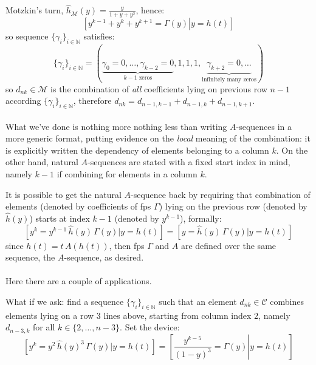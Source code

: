 Motzkin's turn, 
$\hat{h}_{\mathcal{M}}(y) = \frac{y}{1+y+y^2}$, hence:
\begin{displaymath}
        \left.\left[y^{k-1}+y^{k}+y^{k+1}=\Gamma(y)\right| y = h(t) \right]
\end{displaymath}
so sequence $\lbrace \gamma_{i} \rbrace_{i\in\mathbb{N}}$ satisfies:
\begin{displaymath}
    \lbrace \gamma_{i} \rbrace_{i\in\mathbb{N}} = 
        \left(\underbrace{\gamma_{0}=0,\ldots,\gamma_{k-2}=0}_{k-1 \text{ zeros}},
            1,1,1,
            \underbrace{\gamma_{k+2}=0, \ldots}_{\text{infinitely many zeros}} \right)
\end{displaymath}
so $d_{nk}\in\mathcal{M}$ is the combination of \emph{all} coefficients
lying on previous row $n-1$ according $\lbrace \gamma_{i} \rbrace_{i\in\mathbb{N}}$,
therefore $d_{nk}=d_{n-1,k-1}+d_{n-1,k}+d_{n-1,k+1}$.
\\\\
What we've done is nothing more nothing less than writing $A$-sequences 
in a more generic format, putting evidence on the \emph{local} meaning 
of the combination: it is explicitly written the dependency of 
elements belonging to a column $k$. On the other hand, natural $A$-sequences 
are stated with a fixed start index in mind, namely $k-1$ if combining 
for elements in a column $k$.

It is possible to get the natural $A$-sequence back by requiring that 
combination of elements (denoted by coefficients of \ac{fps} $\Gamma$)  
lying on the previous row (denoted by $\hat{h}(y)$)
starts at index $k-1$ (denoted by $y^{k-1}$), formally:
\begin{displaymath}
    \left[y^{k} = y^{k-1}\,\hat{h}(y)\,\Gamma(y) \big| y = h(t) \right] = 
    \left[y = \hat{h}(y)\,\Gamma(y) \big| y = h(t) \right]
\end{displaymath}
since $h(t) = t\,A(h(t))$, then \ac{fps}
$\Gamma$ and $A$ are defined over the same sequence, the $A$-sequence, as desired.
\\\\
Here there are a couple of applications. 

What if we ask: find a sequence $\lbrace \gamma_{i} \rbrace_{i\in\mathbb{N}}$ 
such that an element $d_{nk}\in\mathcal{C}$ combines elements lying on a
row $3$ lines above, starting from column index $2$, 
namely $d_{n-3,k}$ for all $k\in\lbrace 2,\ldots,n-3\rbrace$. 
Set the device:
\begin{displaymath}
    \left[y^{k} = y^{2}\,\hat{h}(y)^3\,\Gamma(y) \big| y = h(t) \right] =
        \left.\left[\frac{y^{k-5}}{(1-y)^3} = \Gamma(y) \right| y = h(t) \right]
\end{displaymath}

